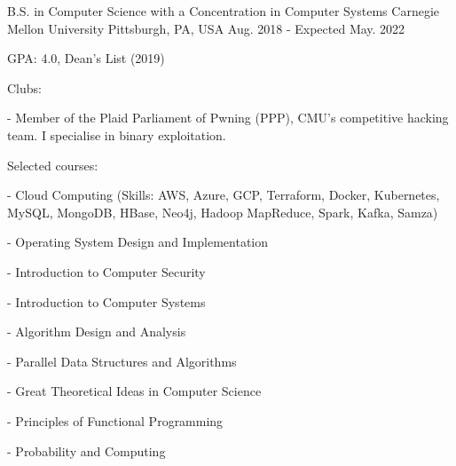 

\begin{cventries}

  \cventry
    {B.S. in Computer Science with a Concentration in Computer Systems} %
    {Carnegie Mellon University} %
    {Pittsburgh, PA, USA} %
    {Aug. 2018 - Expected May. 2022} %
    {
      \begin{cvitems} %
      \item {GPA: 4.0, Dean's List (2019)}
      \item {Clubs:}
      \item[-] {Member of the Plaid Parliament of Pwning (PPP), CMU's competitive hacking team. I specialise in binary exploitation.}
      \item {Selected courses:}
      \item[-] {Cloud Computing (Skills: AWS, Azure, GCP, Terraform, Docker, Kubernetes, MySQL, MongoDB, HBase, Neo4j, Hadoop MapReduce, Spark, Kafka, Samza)}
        \setlength\multicolsep{0pt}
        \begin{multicols}{2}
          \item[-] {Operating System Design and Implementation}
          \item[-] {Introduction to Computer Security}
          \item[-] {Introduction to Computer Systems}
          \item[-] {Algorithm Design and Analysis}
          \item[-] {Parallel Data Structures and Algorithms}
          \item[-] {Great Theoretical Ideas in Computer Science}
          \item[-] {Principles of Functional Programming}
          \item[-] {Probability and Computing}
        \end{multicols}
      \end{cvitems}
    }
\end{cventries}

